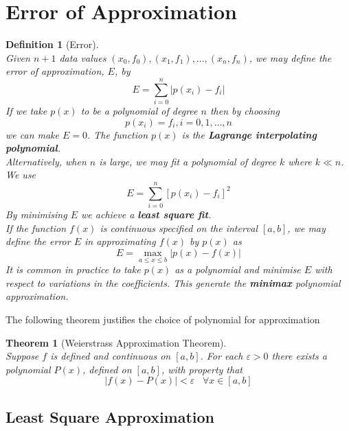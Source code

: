 \documentclass[12pt]{article}
\newtheorem{definition}{Definition}[section]
\newtheorem{theorem}{Theorem}[section]
\theoremstyle{definition}
\begin{document}
\section{Error of Approximation}
\begin{definition}[Error]
\hfill\\\normalfont Given $n+1$ data values $(x_0,f_0), (x_1,f_1),\ldots, (x_n,f_n)$, we may define the error of approximation, $E$, by
\[
E=\sum_{i=0}^n|p(x_i)-f_i|
\]
If we take $p(x)$ to be a polynomial of degree $n$ then by choosing
\[
p(x_i)=f_i, i= 0,1,\ldots, n
\]
we can make $E = 0$. The function $p(x)$ is the \textbf{Lagrange interpolating polynomial}.\\
Alternatively, when $n$ is large, we may fit a polynomial of degree $k$ where $k\ll n$. We use
\[
E=\sum_{i=0}^n[p(x_i)-f_i]^2
\]
By minimising $E$ we achieve a \textbf{least square fit}.\\
If the function $f(x)$ is continuous specified on the interval $[a,b]$, we may define the error $E$ in approximating $f(x)$ by $p(x)$ as
\[
E=\max_{a\leq x \leq b}|p(x)-f(x)|
\]
It is common in practice to take $p(x)$ as a polynomial and minimise $E$ with respect to variations in the coefficients. This generate the \textbf{minimax} polynomial approximation.
\end{definition}
The following theorem justifies the choice of polynomial for approximation
\begin{theorem}[Weierstrass Approximation Theorem]
\hfill\\\normalfont Suppose $f$ is defined and continuous on $[a,b]$. For each $\varepsilon>0$ there exists a polynomial $P(x)$, defined on $[a,b]$, with property that
\[
|f(x)-P(x)|<\varepsilon\;\;\;\forall x\in[a,b]
\]
\end{theorem}
\subsection{Least Square Approximation}
\end{document}
